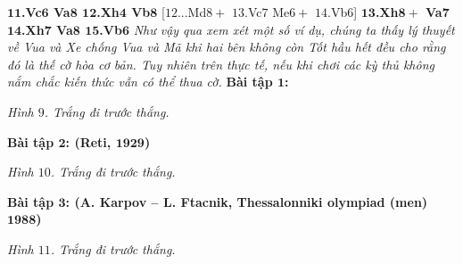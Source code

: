 \begin{multicols}{2}
	\vskip 0.1cm
	\textbf{\color{gocco}$\pmb{11}$.Vc$\pmb{6}$ Va$\pmb{8}$ $\pmb{12}$.Xh$\pmb{4}$ Vb$\pmb{8}$} [$12$...Md$8+$ $13$.Vc$7$ Me$6+$ $14$.Vb$6$]
	\vskip 0.1cm
	\textbf{\color{gocco}$\pmb{13}$.Xh$\pmb{8+}$ Va$\pmb{7}$ $\pmb{14}$.Xh$\pmb{7}$ Va$\pmb{8}$ $\pmb{15}$.Vb$\pmb{6}$}
	\vskip 0.1cm
	\textit{Như vậy qua xem xét một số ví dụ, chúng ta thấy lý thuyết về Vua và Xe  chống Vua và Mã khi hai bên không còn Tốt hầu hết đều cho rằng đó là thế cờ hòa cơ bản. Tuy nhiên trên thực tế, nếu khi chơi các kỳ thủ không nắm chắc kiến thức vẫn có thể thua cờ.}
	\vskip 0.1cm
	\textbf{\color{gocco}Bài tập $\pmb{1}$:}
	\begin{center}
		\newgame
		\scalebox{0.85}\showboard
		\vskip 0.2cm
		\textit{\small\color{gocco}Hình $9$. Trắng đi trước thắng.}
	\end{center}
	\columnbreak
	\textbf{\color{gocco}Bài tập $\pmb{2}$: (Reti, $\pmb{1929}$)}
	\begin{center}
		\newgame
		\scalebox{0.85}\showboard
		\vskip 0.2cm
		\textit{\small\color{gocco}Hình $10$. Trắng đi trước thắng.}
	\end{center}
	\textbf{\color{gocco}Bài tập $\pmb{3}$: (A. Karpov -- L. Ftacnik, Thessalonniki olympiad (men) $\pmb{1988}$)}
	\begin{center}
		\newgame
		\scalebox{0.85}\showboard
		\vskip 0.2cm
		\textit{\small\color{gocco}Hình $11$. Trắng đi trước thắng.}
	\end{center}
%	
\end{multicols}




